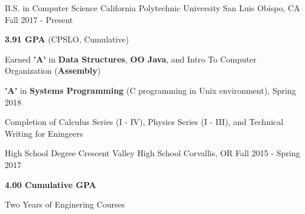 

\begin{cventries}

  \cventry
    {B.S. in Computer Science} %
    {California Polytechnic University} %
    {San Luis Obispo, CA} %
    {Fall 2017 - Present} %
    {
      \begin{cvitems} %
        \item {\textbf{3.91 GPA} (CPSLO, Cumulative)}
        \item {Earned \textbf{'A'} in \textbf{Data Structures}, \textbf{OO Java}, and Intro To Computer Organization (\textbf{Assembly})}
        \item {\textbf{'A'} in \textbf{Systems Programming} (C programming in Unix environment), Spring 2018}
        \item {Completion of Calculus Series (I - IV), Physics Series (I - III), and Technical Writing for Eningeers}
      \end{cvitems}
    }
  \cventry
    {High School Degree} %
    {Crescent Valley High School} %
    {Corvallis, OR} %
    {Fall 2015 - Spring 2017} %
    {
      \begin{cvitems} %
        \item {\textbf{4.00 Cumulative GPA}}
        \item {Two Years of Enginering Courses}
      \end{cvitems}
    }

\end{cventries}
